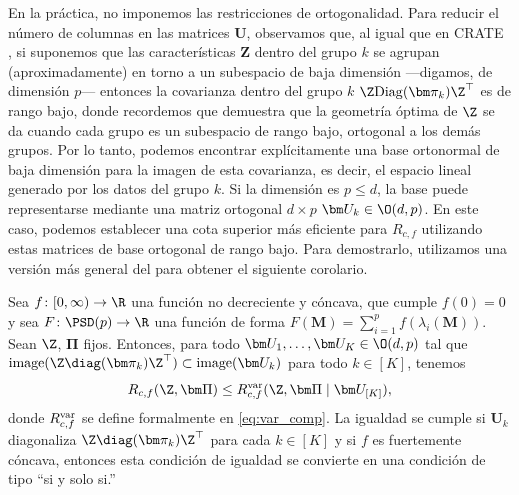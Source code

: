 \documentclass[../../book-main.tex]{subfiles}
\begin{document}
En la práctica, no imponemos las restricciones de ortogonalidad. Para
reducir el número de columnas en las matrices $\bm U$, observamos que,
al igual que en CRATE \citep{yu2023white}, si suponemos que las características $\bm
Z$ dentro del grupo \(k\) se agrupan (aproximadamente) en torno a un
subespacio de baja dimensión ---digamos, de dimensión \(p\)--- entonces la
covarianza dentro del grupo \(k\) \(\Z\mathrm{Diag}(\bm
\pi_{k})\Z^{\top}\) es de rango bajo, donde recordemos que 
\cite{yu2020learning} demuestra que la geometría óptima de $\Z$ se da 
cuando cada grupo es un subespacio de rango bajo, ortogonal a los demás
grupos. Por lo tanto, podemos encontrar explícitamente una base ortonormal de baja dimensión
para la imagen de esta covarianza, es decir, el espacio lineal generado por los
datos del grupo \(k\). Si la dimensión es $p \leq d$, la base puede
representarse mediante una matriz ortogonal $d\times p$ $\bm U_k \in \O(d,
p)$. En este caso, podemos establecer una cota superior más eficiente para \(R_{c,f}\)
utilizando estas matrices de base ortogonal de rango bajo. Para demostrarlo, utilizamos
una versión más general del   para obtener el
siguiente corolario.
\begin{corollary}\label{cor:var_concave_logdet}
    Sea \(f \colon [0, \infty) \to \R\) una función no decreciente y cóncava,
    que cumple \(f(0) = 0\) y sea \(F \colon \PSD(p) \to \R\) una función
    de forma \(F(\bm M) = \sum_{i = 1}^{p}f(\lambda_{i}(\bm M))\).
    Sean \(\Z\), \(\bm \Pi\) fijos. Entonces, para todo \(\bm U_{1},
    \dots, \bm U_{K} \in \O(d, p)\) tal que
    \(\mathrm{image}(\Z\diag(\bm \pi_{k})\Z^{\top}) \subset
    \mathrm{image}(\bm U_{k})\) para todo \(k \in [K]\), tenemos
    \begin{equation}
        R_{c, f}(\Z, \bm\Pi) \leq R_{c, f}^{\rm var}(\Z, \bm\Pi \mid
        \bm U_{[K]}),
    \end{equation}
    donde \(R_{c, f}^{\rm var}\) se define formalmente en
    \eqref{eq:var_comp}. La igualdad se cumple si \(\bm U_{k}\) diagonaliza
    \(\Z\diag(\bm \pi_{k})\Z^{\top}\) para cada \(k \in [K]\) y si
    \(f\) es fuertemente cóncava, entonces esta condición de igualdad se convierte en una condición de tipo
    ``si y solo si.''
\end{corollary}
\end{document}
